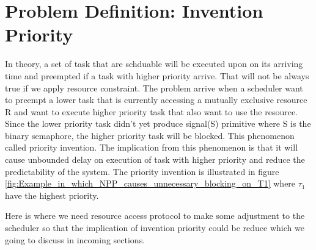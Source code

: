 \section{Problem Definition: Invention Priority}

In theory, a set of task that are schduable will be executed upon on its arriving time and preempted if a task with higher priority arrive. That will not be always true if we apply resource constraint. The problem arrive when a scheduler want to preempt a lower task that is currently accessing a mutually exclusive resource R and want to execute higher priority task that also want to use the resource. Since the lower priority task didn't yet produce signal(S) primitive where S is the binary semaphore, the higher priority task will be blocked. This phenomenon called priority invention. The implication from this phenomenon is that it will cause unbounded delay on execution of task with higher priority and reduce the predictability of the system. The priority invention is illustrated in figure \ref{fig:Example_in_which_NPP_causes_unnecessary_blocking_on_T1} where $ \tau_{1} $ have the highest priority.

Here is where we need resource access protocol to make some adjustment to the scheduler so that the implication of invention priority could be reduce which we going to discuss in incoming sections.